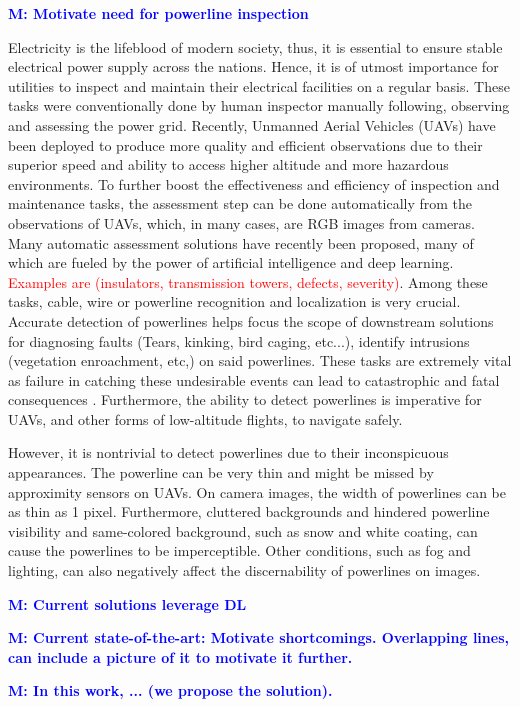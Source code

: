 \documentclass[journal]{IEEEtran}
\newcommand{\commentM}[1]{\textbf{\textcolor{blue}{M: #1}}}
\begin{document}
\commentM{Motivate need for powerline inspection}

Electricity is the lifeblood of modern society, thus, it is essential to ensure stable electrical power supply across the nations. Hence, it is of utmost importance for utilities to inspect and maintain their electrical facilities on a regular basis. These tasks were conventionally done by human inspector manually following, observing and assessing the power grid. Recently, Unmanned Aerial
Vehicles (UAVs) have been deployed to produce more quality and efficient observations due to their superior speed and ability to access higher altitude and more hazardous environments. To further boost the effectiveness and efficiency of inspection and maintenance tasks, the assessment step can be done automatically from the observations of UAVs, which, in many cases, are RGB images from cameras. Many automatic assessment solutions have recently been proposed, many of which are fueled by the power of artificial intelligence and deep learning. \textcolor{red}{Examples are (insulators, transmission towers, defects, severity)}. Among these tasks, cable, wire or powerline recognition and localization is very crucial. Accurate detection of powerlines helps focus the scope of downstream solutions for diagnosing faults (Tears, kinking, bird caging, etc...), identify intrusions (vegetation enroachment, etc,) on said powerlines. These tasks are extremely vital as failure in catching these undesirable events can lead to catastrophic and fatal consequences \cite{pge_bankruptcy}. Furthermore, the ability to detect powerlines is imperative for UAVs, and other forms of low-altitude flights, to navigate safely.

However, it is nontrivial to detect powerlines due to their inconspicuous appearances. The powerline can be very thin and might be missed by approximity sensors on UAVs. On camera images, the width of powerlines can be as thin as 1 pixel. Furthermore, cluttered backgrounds and hindered powerline visibility and same-colored background, such as snow and white coating, can cause the powerlines to be imperceptible. Other conditions, such as fog and lighting, can also negatively affect the discernability of powerlines on images. 

\commentM{Current solutions leverage DL}

\commentM{Current state-of-the-art: Motivate shortcomings. Overlapping lines, can include a picture of it to motivate it further.}

\commentM{In this work, ... (we propose the solution).}
\end{document}
